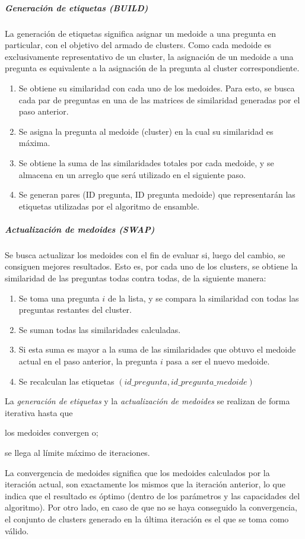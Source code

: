 \subparagraph{Generación de etiquetas (BUILD)}
La generación de etiquetas significa asignar un medoide a una pregunta en particular, con el objetivo del armado de clusters. Como cada medoide es exclusivamente representativo de un cluster, la asignación de un medoide a una pregunta es equivalente a la asignación de la pregunta al cluster correspondiente.
\begin{enumerate}
	\item Se obtiene su similaridad con cada uno de los medoides. Para esto, se busca cada par de preguntas en una de las matrices de similaridad generadas por el paso anterior.
	\item Se asigna la pregunta al medoide (cluster) en la cual su similaridad es máxima.
	\item Se obtiene la suma de las similaridades totales por cada medoide, y se almacena en un arreglo que será utilizado en el siguiente paso.
	\item Se generan pares (ID pregunta, ID pregunta medoide) que representarán las etiquetas utilizadas por el algoritmo de ensamble.
\end{enumerate}

\subparagraph{Actualización de medoides (SWAP)}
Se busca actualizar los medoides con el fin de evaluar si, luego del cambio, se consiguen mejores resultados. Esto es, por cada uno de los clusters, se obtiene la similaridad de las preguntas todas contra todas, de la siguiente manera:

\begin{enumerate}
	\item Se toma una pregunta \(i\) de la lista, y se compara la similaridad con todas las preguntas restantes del cluster.
	\item Se suman todas las similaridades calculadas.
	\item Si esta suma es mayor a la suma de las similaridades que obtuvo el medoide actual en el paso anterior, la pregunta \(i\) pasa a ser el nuevo medoide.
	\item Se recalculan las etiquetas \((id\_pregunta, id\_pregunta\_medoide)\)
\end{enumerate}

La \textit{generación de etiquetas} y la \textit{actualización de medoides} se realizan de forma iterativa hasta que \begin{enumerate*} [label=(\roman*)] \item los medoides convergen o; \item se llega al límite máximo de iteraciones.\end{enumerate*} La convergencia de medoides significa que los medoides calculados por la iteración actual, son exactamente los mismos que la iteración anterior, lo que indica que el resultado es óptimo (dentro de los parámetros y las capacidades del algoritmo). Por otro lado, en caso de que no se haya conseguido la convergencia, el conjunto de clusters generado en la última iteración es el que se toma como válido.

